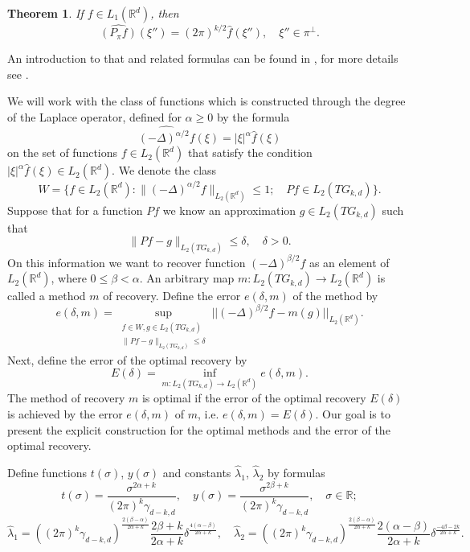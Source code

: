 \documentclass[12pt]{iopart}
\newtheorem{theorem}{Theorem}
\begin{document}
\begin{theorem}
\label{projection}
If $f\in L_1(\mathbb R^d)$, then
$$\widehat{(P_\pi f)}(\xi'')=(2\pi)^{k/2}\widehat f(\xi''),\quad \xi''\in\pi^\perp.$$
\end{theorem}
An introduction to that and related formulas can be found in \cite{K}, for more details see \cite{H}.

We will work with the class of functions which is constructed through the degree of the Laplace operator, defined for $\alpha\ge 0$ by the formula 
$$\widehat{(-\Delta)^{\alpha/2}f}(\xi)=|\xi|^\alpha \widehat f(\xi)$$ on the set of functions $f\in L_2(\mathbb R^d)$ that satisfy the condition $|\xi|^\alpha\widehat f(\xi)\in L_2(\mathbb R^d)$.
We denote the class 
$$ W=\{f\in L_2(\mathbb R^d) :
\|(-\Delta)^{\alpha/2}f\|_{L_2(\mathbb R^d)}\leqslant  1;\quad Pf\in L_2(TG_{k,d}) \}.  $$
Suppose that for a function $Pf$ we know an approximation $g\in L_2(TG_{k,d})$ such that
	$$\|Pf-g\|_{L_2(TG_{k,d})}\le\delta, \quad\delta>0.$$
On this information we want to recover function $(-\Delta)^{\beta/2}f$ as an element of $ L_2(\mathbb R^d)$, where $0\le\beta<\alpha$. An arbitrary map $m:L_2(TG_{k,d})\rightarrow L_2(\mathbb R^d)$ is called a method $m$ of recovery. Define the error $e(\delta,m)$ of the method by
\[
  e(\delta,m)=\sup_{
  \begin{smallmatrix}
f\in W, g\in L_2(TG_{k,d})\\ 
\|Pf-g\|_{L_2(TG_{k,d})}\leqslant \delta
\end{smallmatrix}} ||(-\Delta)^{\beta/2}f-m(g)||_{L_2(\mathbb R^d)}.
\] 
Next, define the error of the optimal recovery by
\begin{equation}
\label{opter}
E(\delta)=\inf_{m:L_2(TG_{k,d})\rightarrow L_2(\mathbb R^d)}e(\delta,m).
\end{equation}
The method of recovery $m$ is optimal if the error of the optimal recovery $E(\delta)$ is achieved by the error $e(\delta,m)$ of $m$, i.e. $e(\delta,m)=E(\delta)$. Our goal is to present the explicit construction for the optimal methods and the error of the optimal recovery.

Define functions $t(\sigma)$, $y(\sigma)$ and constants $\widehat\lambda_1$, $\widehat\lambda_2$ by formulas
  \begin{equation}
  \label{xy}
  t(\sigma)=\frac{\sigma^{2\alpha+k}}{(2\pi)^{k}\gamma_{d-k,d}},\quad
  y(\sigma)=\frac{\sigma^{2\beta+k}}{(2\pi)^{k}\gamma_{d-k,d}},\quad \sigma\in\mathbb R;
  \end{equation}
  \begin{equation}
    \label{lambda}
    \widehat\lambda_1=((2\pi)^k\gamma_{d-k,d})^{\frac{2(\beta-\alpha)}{2\alpha+k}}\frac{2\beta+k}{2\alpha+k}\delta^\frac{4(\alpha-\beta)}{2\alpha+k},\quad \widehat\lambda_2=((2\pi)^k\gamma_{d-k,d})^{\frac{2(\beta-\alpha)}{2\alpha+k}}\frac{2(\alpha-\beta)}{2\alpha+k}\delta^\frac{-4\beta-2k}{2\alpha+k}. 
  \end{equation}
\end{document}
